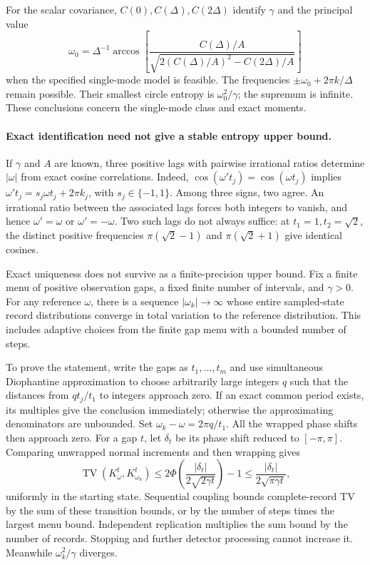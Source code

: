 For the scalar covariance, $C(0),C(\Delta),C(2\Delta)$ identify
$\gamma$ and the principal value
\[
 \omega_0=\Delta^{-1}\arccos\!\left[
 \frac{C(\Delta)/A}{\sqrt{2(C(\Delta)/A)^2-C(2\Delta)/A}}\right]
\]
when the specified single-mode model is feasible. The frequencies
$\pm\omega_0+2\pi k/\Delta$ remain possible. Their smallest
circle entropy is $\omega_0^2/\gamma$; the supremum is infinite.
These conclusions concern the single-mode class and exact moments.

\paragraph{Exact identification need not give a stable entropy upper bound.}
If $\gamma$ and $A$ are known, three positive lags with pairwise irrational
ratios determine $|\omega|$ from exact cosine correlations. Indeed,
$\cos(\omega' t_j)=\cos(\omega t_j)$ implies
$\omega't_j=s_j\omega t_j+2\pi k_j$, with $s_j\in\{-1,1\}$.
Among three signs, two agree. An irrational ratio between the associated
lags forces both integers to vanish, and hence $\omega'=\omega$ or
$\omega'=-\omega$. Two such lags do not always suffice: at
$t_1=1,t_2=\sqrt2$, the distinct positive frequencies
$\pi(\sqrt2-1)$ and $\pi(\sqrt2+1)$ give identical cosines.

Exact uniqueness does not survive as a finite-precision upper bound.
Fix a finite menu of positive observation gaps, a fixed finite number of
intervals, and $\gamma>0$. For any reference $\omega$, there is a sequence
$|\omega_k|\to\infty$ whose entire sampled-state record distributions
converge in total variation to the reference distribution. This includes
adaptive choices from the finite gap menu with a bounded number of steps.

To prove the statement, write the gaps as $t_1,\ldots,t_m$ and use
simultaneous Diophantine approximation to choose arbitrarily large integers
$q$ such that the distances from $q t_j/t_1$ to integers approach zero.
If an exact common period exists, its multiples give the conclusion
immediately; otherwise the approximating denominators are unbounded.
Set $\omega_k-\omega=2\pi q/t_1$. All the wrapped phase shifts then
approach zero. For a gap $t$, let $\delta_t$ be its phase shift reduced to
$[-\pi,\pi]$. Comparing unwrapped normal increments and then wrapping gives
\begin{equation}
 \operatorname{TV}(K_\omega^t,K_{\omega_k}^t)
 \leq 2\Phi\!\left(\frac{|\delta_t|}{2\sqrt{2\gamma t}}\right)-1
 \leq\frac{|\delta_t|}{2\sqrt{\pi\gamma t}},
 \label{eq:pa-phase-tv}
\end{equation}
uniformly in the starting state. Sequential coupling bounds complete-record
TV by the sum of these transition bounds, or by the number of steps times
the largest menu bound. Independent replication multiplies the sum bound
by the number of records. Stopping and further detector processing cannot
increase it. Meanwhile $\omega_k^2/\gamma$ diverges.

